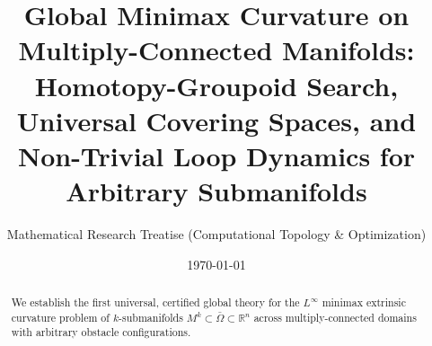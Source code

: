 \documentclass[11pt,reqno]{amsart}
\theoremstyle{definition}
\providecommand{\R}{\mathbb{R}}
\numberwithin{equation}{section}
\providecommand{\R}{\mathbb{R}}
\begin{document}
\title[Global Minimax Curvature via Homotopy Groupoids and Covering Spaces]{Global Minimax Curvature on Multiply-Connected Manifolds: Homotopy-Groupoid Search, Universal Covering Spaces, and Non-Trivial Loop Dynamics for Arbitrary Submanifolds}

\author{Mathematical Research Treatise (Computational Topology \& Optimization)}
\address{Programa de P\'os-Gradua\c{c}\~ao em Estat\'istica e Experimenta\c{c}\~ao Agropecu\'aria (PPGEEAA/DES), Universidade Federal de Lavras (UFLA)}

\date{\today}

\begin{abstract}
We establish the first universal, certified global theory for the $L^\infty$ minimax extrinsic curvature problem of $k$-submanifolds $M^k \subset \bar{\Omega} \subset \R^n$ across multiply-connected domains with arbitrary obstacle configurations. 


\end{abstract}
\end{document}
